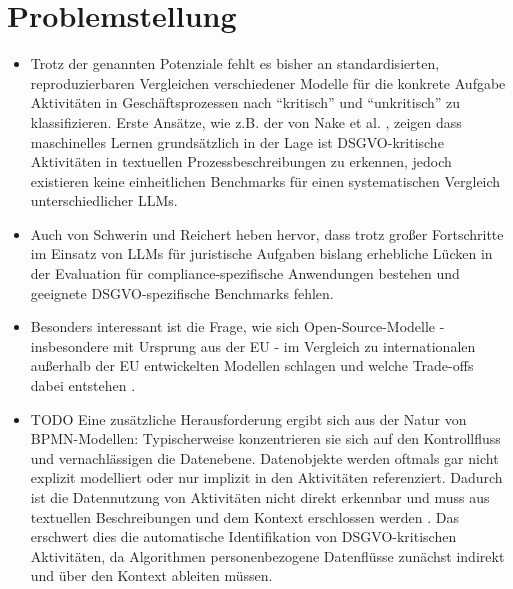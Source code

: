 \section{Problemstellung}\label{sec:problemstellung}

\begin{itemize}
    \item Trotz der genannten Potenziale fehlt es bisher an standardisierten, reproduzierbaren Vergleichen verschiedener Modelle für die konkrete Aufgabe Aktivitäten in Geschäftsprozessen nach \enquote{kritisch} und \enquote{unkritisch} zu klassifizieren. Erste Ansätze, wie z.B. der von Nake et al. \cite{nake2023towards}, zeigen dass maschinelles Lernen grundsätzlich in der Lage ist \ac{DSGVO}-kritische Aktivitäten in textuellen Prozessbeschreibungen zu erkennen, jedoch existieren keine einheitlichen Benchmarks für einen systematischen Vergleich unterschiedlicher LLMs.
    \item Auch von Schwerin und Reichert \cite{schwerin2024systematic} heben hervor, dass trotz großer Fortschritte im Einsatz von \acp{LLM} für juristische Aufgaben bislang erhebliche Lücken in der Evaluation für compliance-spezifische Anwendungen bestehen und geeignete \ac{DSGVO}-spezifische Benchmarks fehlen.
    \item Besonders interessant ist die Frage, wie sich Open-Source-Modelle - insbesondere mit Ursprung aus der \ac{EU} - im Vergleich zu internationalen außerhalb der \ac{EU} entwickelten Modellen schlagen und welche Trade-offs dabei entstehen \cite{schwerin2024systematic}.
    \item TODO Eine zusätzliche Herausforderung ergibt sich aus der Natur von \ac{BPMN}-Modellen: Typischerweise konzentrieren sie sich auf den Kontrollfluss und vernachlässigen die Datenebene. Datenobjekte werden oftmals gar nicht explizit modelliert oder nur implizit in den Aktivitäten referenziert. Dadurch ist die Datennutzung von Aktivitäten nicht direkt erkennbar und muss aus textuellen Beschreibungen und dem Kontext erschlossen werden \cite{schneid2021uncovering}. Das erschwert dies die automatische Identifikation von \ac{DSGVO}-kritischen Aktivitäten, da Algorithmen personenbezogene Datenflüsse zunächst indirekt und über den Kontext ableiten müssen.
\end{itemize}